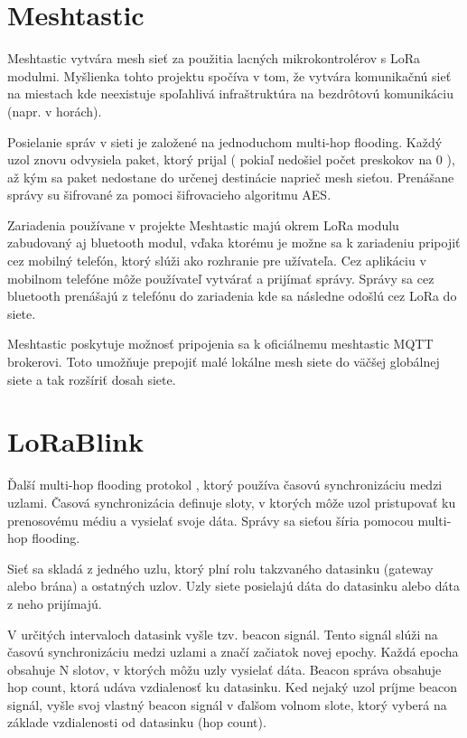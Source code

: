 \documentclass[slovak,master]{diploma}
\begin{document}
\section{Meshtastic}
Meshtastic vytvára mesh sieť za použitia lacných mikrokontrolérov s LoRa modulmi.
Myšlienka tohto projektu spočíva v tom, že vytvára komunikačnú sieť na miestach kde neexistuje spoľahlivá infraštruktúra na bezdrôtovú komunikáciu (napr. v horách).

Posielanie správ v sieti je založené na jednoduchom multi-hop flooding.
Každý uzol znovu odvysiela paket, ktorý prijal ( pokiaľ nedošiel počet preskokov na 0 ), až kým sa paket nedostane do určenej destinácie naprieč mesh sieťou.
Prenášane správy su šifrované za pomoci šifrovacieho algoritmu AES.

Zariadenia používane v projekte Meshtastic majú okrem LoRa modulu zabudovaný aj bluetooth modul, vďaka ktorému je možne sa k zariadeniu pripojiť cez mobilný telefón, ktorý slúži ako rozhranie pre 
užívateľa. Cez aplikáciu v mobilnom telefóne môže používateľ vytvárať a prijímať správy. Správy sa cez bluetooth prenášajú z telefónu do zariadenia kde sa následne odošlú cez 
LoRa do siete.

Meshtastic poskytuje možnosť pripojenia sa k oficiálnemu meshtastic MQTT brokerovi. Toto umožňuje prepojiť malé lokálne mesh siete do väčšej globálnej siete a 
tak rozšíriť dosah siete.

\section{LoRaBlink}
Ďalší multi-hop flooding protokol \cite{lorablink}, ktorý používa časovú synchronizáciu medzi uzlami. Časová synchronizácia definuje sloty, v ktorých môže uzol pristupovať ku prenosovému médiu a 
vysielať svoje dáta. Správy sa sieťou šíria pomocou multi-hop flooding.

Sieť sa skladá z jedného uzlu, ktorý plní rolu takzvaného datasinku (gateway alebo brána) a ostatných uzlov. Uzly siete posielajú dáta do datasinku alebo dáta z neho prijímajú.

V určitých intervaloch datasink vyšle tzv. beacon signál. Tento signál slúži na časovú synchronizáciu medzi uzlami a značí začiatok novej epochy. 
Každá epocha obsahuje N slotov, v ktorých môžu uzly vysielať dáta. Beacon správa obsahuje hop count, ktorá udáva vzdialenosť ku datasinku.
Ked nejaký uzol príjme beacon signál, vyšle svoj vlastný beacon signál v ďalšom volnom slote, ktorý vyberá na základe vzdialenosti od datasinku (hop count).
\end{document}
